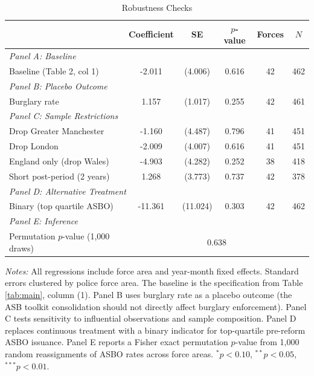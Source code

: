 \begin{table}[htbp]
\centering
\caption{Robustness Checks}
\label{tab:robustness}
\begin{threeparttable}
\small
\begin{tabular}{lccccc}
\hline\hline
 & Coefficient & SE & $p$-value & Forces & $N$ \\
\hline
\multicolumn{6}{l}{\textit{Panel A: Baseline}} \\
Baseline (Table 2, col 1) & -2.011 & (4.006) & 0.616 & 42 & 462 \\
\hline
\multicolumn{6}{l}{\textit{Panel B: Placebo Outcome}} \\
Burglary rate & 1.157 & (1.017) & 0.255 & 42 & 461 \\
\hline
\multicolumn{6}{l}{\textit{Panel C: Sample Restrictions}} \\
Drop Greater Manchester & -1.160 & (4.487) & 0.796 & 41 & 451 \\
Drop London & -2.009 & (4.007) & 0.616 & 41 & 451 \\
England only (drop Wales) & -4.903 & (4.282) & 0.252 & 38 & 418 \\
Short post-period (2 years) & 1.268 & (3.773) & 0.737 & 42 & 378 \\
\hline
\multicolumn{6}{l}{\textit{Panel D: Alternative Treatment}} \\
Binary (top quartile ASBO) & -11.361 & (11.024) & 0.303 & 42 & 462 \\
\hline
\multicolumn{6}{l}{\textit{Panel E: Inference}} \\
Permutation $p$-value (1,000 draws) & \multicolumn{5}{c}{0.638} \\
\hline\hline
\end{tabular}
\begin{tablenotes}[flushleft]\small
\item \textit{Notes:} All regressions include force area and year-month fixed effects. Standard errors clustered by police force area. The baseline is the specification from Table \ref{tab:main}, column (1). Panel B uses burglary rate as a placebo outcome (the ASB toolkit consolidation should not directly affect burglary enforcement). Panel C tests sensitivity to influential observations and sample composition. Panel D replaces continuous treatment with a binary indicator for top-quartile pre-reform ASBO issuance. Panel E reports a Fisher exact permutation $p$-value from 1,000 random reassignments of ASBO rates across force areas. $^{*}p<0.10$, $^{**}p<0.05$, $^{***}p<0.01$.
\end{tablenotes}
\end{threeparttable}
\end{table}
